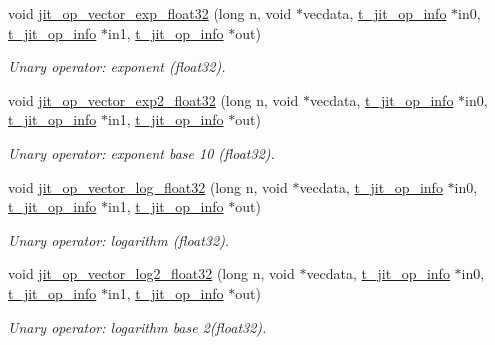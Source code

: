 \begin{DoxyCompactItemize}
void \hyperlink{group__opvecmod_gad7efeea7c1d620197481cb1b9d7b46e4}{jit\_\-op\_\-vector\_\-exp\_\-float32} (long n, void $\ast$vecdata, \hyperlink{structt__jit__op__info}{t\_\-jit\_\-op\_\-info} $\ast$in0, \hyperlink{structt__jit__op__info}{t\_\-jit\_\-op\_\-info} $\ast$in1, \hyperlink{structt__jit__op__info}{t\_\-jit\_\-op\_\-info} $\ast$out)
\begin{DoxyCompactList}\small\item\em Unary operator: exponent (float32). \item\end{DoxyCompactList}\item 
void \hyperlink{group__opvecmod_gab9dbf960d557a8a0762805ede759a295}{jit\_\-op\_\-vector\_\-exp2\_\-float32} (long n, void $\ast$vecdata, \hyperlink{structt__jit__op__info}{t\_\-jit\_\-op\_\-info} $\ast$in0, \hyperlink{structt__jit__op__info}{t\_\-jit\_\-op\_\-info} $\ast$in1, \hyperlink{structt__jit__op__info}{t\_\-jit\_\-op\_\-info} $\ast$out)
\begin{DoxyCompactList}\small\item\em Unary operator: exponent base 10 (float32). \item\end{DoxyCompactList}\item 
void \hyperlink{group__opvecmod_ga824a2770fb804d1a31a53465bbcc15a6}{jit\_\-op\_\-vector\_\-log\_\-float32} (long n, void $\ast$vecdata, \hyperlink{structt__jit__op__info}{t\_\-jit\_\-op\_\-info} $\ast$in0, \hyperlink{structt__jit__op__info}{t\_\-jit\_\-op\_\-info} $\ast$in1, \hyperlink{structt__jit__op__info}{t\_\-jit\_\-op\_\-info} $\ast$out)
\begin{DoxyCompactList}\small\item\em Unary operator: logarithm (float32). \item\end{DoxyCompactList}\item 
void \hyperlink{group__opvecmod_ga962dedc87c39d85e6bd21d765a865a67}{jit\_\-op\_\-vector\_\-log2\_\-float32} (long n, void $\ast$vecdata, \hyperlink{structt__jit__op__info}{t\_\-jit\_\-op\_\-info} $\ast$in0, \hyperlink{structt__jit__op__info}{t\_\-jit\_\-op\_\-info} $\ast$in1, \hyperlink{structt__jit__op__info}{t\_\-jit\_\-op\_\-info} $\ast$out)
\begin{DoxyCompactList}\small\item\em Unary operator: logarithm base 2(float32). \item\end{DoxyCompactList}\item 

\end{DoxyCompactItemize}
